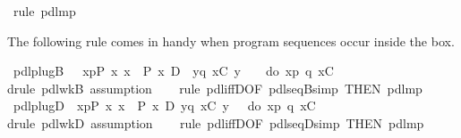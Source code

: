 \begin{isabellebody}
\ {\isacharparenleft}rule\ pdl{\isacharunderscore}mp{\isacharparenright}\isanewline
\isamarkupfalse%
\isamarkupfalse%
%
\begin{isamarkuptext}%
The following rule comes in handy when program sequences occur inside the box.%
\end{isamarkuptext}%
\isamarkuptrue%
\ pdl{\isacharunderscore}plugB{\isacharcolon}\ {\isachardoublequote}{\isasymlbrakk}{\isasymturnstile}\ {\isacharbrackleft}{\isacharhash}\ x{\isasymleftarrow}p{\isacharbrackright}{\isacharparenleft}P\ x{\isacharparenright}{\isacharsemicolon}\ {\isasymforall}x{\isachardot}\ {\isasymturnstile}\ P\ x\ {\isasymlongrightarrow}\isactrlsub D\ {\isacharbrackleft}{\isacharhash}\ y{\isasymleftarrow}q\ x{\isacharbrackright}{\isacharparenleft}C\ y{\isacharparenright}{\isasymrbrakk}\ {\isasymLongrightarrow}\ {\isasymturnstile}\ {\isacharbrackleft}{\isacharhash}\ do\ {\isacharbraceleft}x{\isasymleftarrow}p{\isacharsemicolon}\ q\ x{\isacharbraceright}{\isacharbrackright}C{\isachardoublequote}\isanewline
\ \ \isamarkupfalse%
drule\ pdl{\isacharunderscore}wkB{\isacharcomma}\ assumption{\isacharparenright}\isanewline
\ \ \isamarkupfalse%
\ {\isacharparenleft}rule\ pdl{\isacharunderscore}iffD{}{\isacharbrackleft}OF\ pdl{\isacharunderscore}seqB{\isacharunderscore}simp{\isacharcomma}\ THEN\ pdl{\isacharunderscore}mp{\isacharbrackright}{\isacharparenright}\isanewline
\isanewline
\isamarkupfalse%
\ pdl{\isacharunderscore}plugD{\isacharcolon}\ {\isachardoublequote}{\isasymlbrakk}{\isasymturnstile}\ {\isasymlangle}x{\isasymleftarrow}p{\isasymrangle}{\isacharparenleft}P\ x{\isacharparenright}{\isacharsemicolon}\ {\isasymforall}x{\isachardot}\ {\isasymturnstile}\ P\ x\ {\isasymlongrightarrow}\isactrlsub D\ {\isasymlangle}y{\isasymleftarrow}q\ x{\isasymrangle}{\isacharparenleft}C\ y{\isacharparenright}{\isasymrbrakk}\ {\isasymLongrightarrow}\ {\isasymturnstile}\ {\isasymlangle}do\ {\isacharbraceleft}x{\isasymleftarrow}p{\isacharsemicolon}\ q\ x{\isacharbraceright}{\isasymrangle}C{\isachardoublequote}\isanewline
\ \ \isamarkupfalse%
drule\ pdl{\isacharunderscore}wkD{\isacharcomma}\ assumption{\isacharparenright}\isanewline
\ \ \isamarkupfalse%
\ {\isacharparenleft}rule\ pdl{\isacharunderscore}iffD{}{\isacharbrackleft}OF\ pdl{\isacharunderscore}seqD{\isacharunderscore}simp{\isacharcomma}\ THEN\ pdl{\isacharunderscore}mp{\isacharbrackright}{\isacharparenright}\isanewline

\end{isabellebody}
